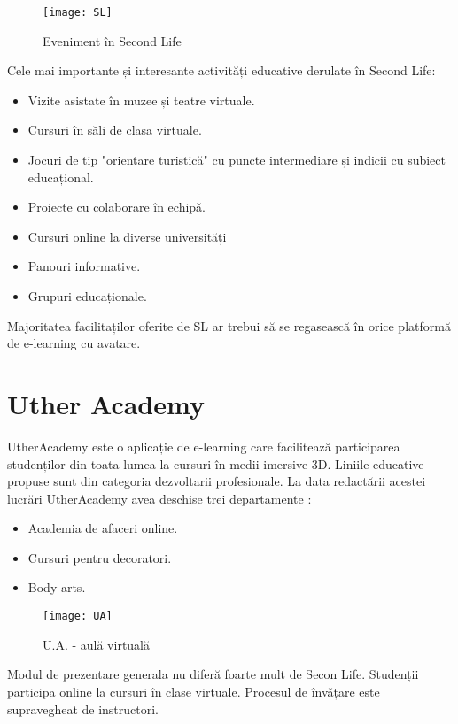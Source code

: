 \begin{figure}[h]
    \centering
    \texttt{[image: SL]}
    \caption{Eveniment în Second Life}
    \label{fig:imag3}
\end{figure}

\par Cele mai importante și interesante activități educative derulate în Second Life:
\begin{itemize}
\item Vizite asistate în muzee și teatre virtuale.
\item Cursuri în săli de clasa virtuale.
\item Jocuri de tip "orientare turistică" cu puncte intermediare și indicii cu subiect educațional.
\item Proiecte cu colaborare în echipă.
\item Cursuri online la diverse universități 
\item Panouri informative.
\item Grupuri educaționale.
\end{itemize}

\par Majoritatea facilitaților oferite de SL ar trebui să se regasească în orice platformă de e-learning cu avatare. 

\section{Uther Academy}
\par UtherAcademy este o aplicație de e-learning care facilitează participarea studenților din toata lumea la cursuri în medii imersive 3D. Liniile educative propuse sunt din categoria dezvoltarii profesionale. La data redactării acestei lucrări UtherAcademy avea deschise trei departamente :

\begin{itemize}
\item Academia de afaceri online.
\item Cursuri pentru decoratori.
\item Body arts.
\end{itemize}

\begin{figure}[h]
    \centering
    \texttt{[image: UA]}
    \caption{U.A. - aulă virtuală}
    \label{fig:imag4}
\end{figure}
    
\par Modul de prezentare generala nu diferă foarte mult de Secon Life. Studenții participa online la cursuri în clase virtuale. Procesul de învățare este supravegheat de instructori.

